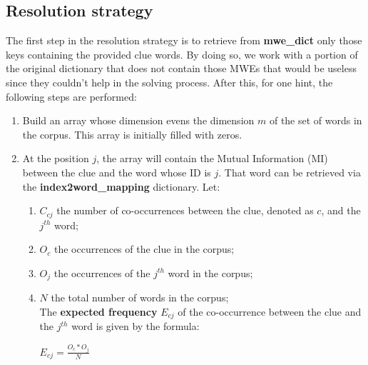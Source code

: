 \documentclass[twoside,twocolumn]{article}
\begin{document}
	\subsection{Resolution strategy}
	The first step in the resolution strategy is to retrieve from \textbf{mwe\_dict} only those keys containing the provided clue words. By doing so, we work with a portion of the original dictionary that does not contain those MWEs that would be useless since they couldn't help in the solving process. After this, for one hint, the following steps are performed:
	\begin{enumerate}
	\item Build an array whose dimension evens the dimension $m$ of the set of words in the corpus. This array is initially filled with zeros.
	\item At the position $j$, the array will contain the Mutual Information (MI) between the clue and the word whose ID is $j$. That word can be retrieved via the \textbf{index2word\_mapping} dictionary. Let:
	\begin{enumerate}
	\item $C_{cj}$ the number of co-occurrences between the clue, denoted as $c$, and the $j^{th}$ word;
	\item $O_c$ the occurrences of the clue in the corpus;
	\item $O_j$ the occurrences of the $j^{th}$ word in the corpus;
	\item $N$ the total number of words in the corpus; \\
	The \textbf{expected frequency} $E_{cj}$ of the co-occurrence between the clue and the  $j^{th}$ word is given by the formula:
	\begin{center}
	$E_{cj} = \frac{O_c * O_j}{N}$ \\
	\end{center}
	

\end{enumerate}
\end{enumerate}
\end{document}
